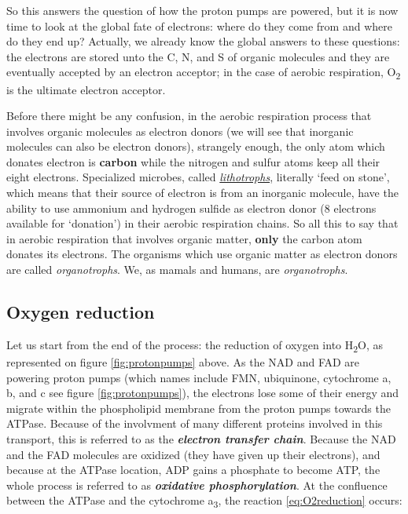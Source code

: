 \documentclass[]{book}
\theoremstyle{definition}
\theoremstyle{definition}
\theoremstyle{definition}
\theoremstyle{remark}
\begin{document}
So this answers the question of how the proton pumps are powered, but it
is now time to look at the global fate of electrons: where do they come
from and where do they end up? Actually, we already know the global
answers to these questions: the electrons are stored unto the C, N, and
S of organic molecules and they are eventually accepted by an electron
acceptor; in the case of aerobic respiration, O\textsubscript{2} is the
ultimate electron acceptor.

Before there might be any confusion, in the aerobic respiration process
that involves organic molecules as electron donors (we will see that
inorganic molecules can also be electron donors), strangely enough, the
only atom which donates electron is \textbf{carbon} while the nitrogen
and sulfur atoms keep all their eight electrons. Specialized microbes,
called \emph{\protect\hyperlink{lithotrophs}{lithotrophs}}, literally
`feed on stone', which means that their source of electron is from an
inorganic molecule, have the ability to use ammonium and hydrogen
sulfide as electron donor (8 electrons available for `donation') in
their aerobic respiration chains. So all this to say that in aerobic
respiration that involves organic matter, \textbf{only} the carbon atom
donates its electrons. The organisms which use organic matter as
electron donors are called \emph{organotrophs}. We, as mamals and
humans, are \emph{organotrophs}.

\subsection{Oxygen reduction}\label{oxygen-reduction}

Let us start from the end of the process: the reduction of oxygen into
H\textsubscript{2}O, as represented on figure \ref{fig:protonpumps}
above. As the NAD and FAD are powering proton pumps (which names include
FMN, ubiquinone, cytochrome a, b, and c see figure
\ref{fig:protonpumps}), the electrons lose some of their energy and
migrate within the phospholipid membrane from the proton pumps towards
the ATPase. Because of the involvment of many different proteins
involved in this transport, this is referred to as the
\emph{\textbf{electron transfer chain}}. Because the NAD and the FAD
molecules are oxidized (they have given up their electrons), and because
at the ATPase location, ADP gains a phosphate to become ATP, the whole
process is referred to as \emph{\textbf{oxidative phosphorylation}}. At
the confluence between the ATPase and the cytochrome a\textsubscript{3},
the reaction \eqref{eq:O2reduction} occurs:
\end{document}
